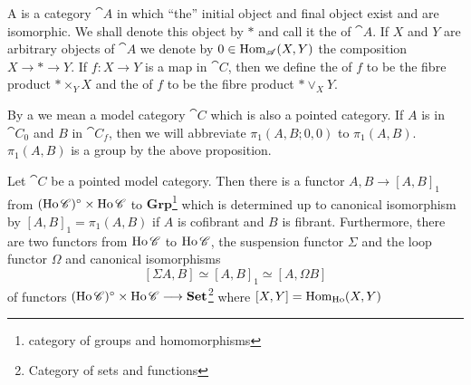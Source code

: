 \documentclass[../main]{subfiles}
\begin{document}
\begin{definition}
    \label{def:1.2.4}
    A  is a category $\cat{A}$ in which ``the'' initial object and final object exist and are isomorphic. We shall denote this object by $*$ and call it the  of $\cat{A}$. If $X$ and $Y$ are arbitrary objects of $\cat{A}$ we denote by $0 \in \operatorname{Hom}_{\mathscr{A}}(X,Y)$ the composition $X \longrightarrow * \longrightarrow Y$. If $f \colon X \longrightarrow Y$ is a map in $\cat{C}$, then we define the  of $f$ to be the fibre product $* \times_Y X$ and the  of $f$ to be the fibre product $*\vee_X Y$.
    
    By a  we mean a model category $\cat{C}$ which is also a pointed category. If $A$ is in $\cat{C}_0$ and $B$ in $\cat{C}_f$, then we will abbreviate $\pi_1(A,B;0,0)$ to $\pi_1(A,B)$. $\pi_1(A,B)$ is a group by the above proposition.
\end{definition}

\begin{theorem}
    \label{thm:2}
    Let $\cat{C}$ be a pointed model category. Then there is a functor $A,B \longrightarrow [A,B]_1$ from $(\operatorname{Ho}\mathscr{C})^{\circ} \times \operatorname{Ho}\mathscr{C}$ to $\mathbf{Grp}$\footnote{category of groups and homomorphisms} which is determined up to canonical isomorphism by $[A,B]_1 = \pi_1(A,B)$ if $A$ is cofibrant and $B$ is fibrant. Furthermore, there are two functors from $\operatorname{Ho} \mathscr{C}$ to $\operatorname{Ho} \mathscr{C}$, the suspension functor $\Sigma$ and the loop functor $\Omega$ and canonical isomorphisms 
    \[
    [\Sigma A, B] \simeq [A,B]_1 \simeq [A, \Omega B]
    \]
    of functors $(\operatorname{Ho} \mathscr{C})^{\circ} \times \operatorname{Ho} \mathscr{C} \longrightarrow \mathbf{Set}$\footnote{Category of sets and functions} where $[X,Y] = \operatorname{Hom}_{\operatorname{Ho}} (X,Y)$
\end{theorem}
\end{document}
